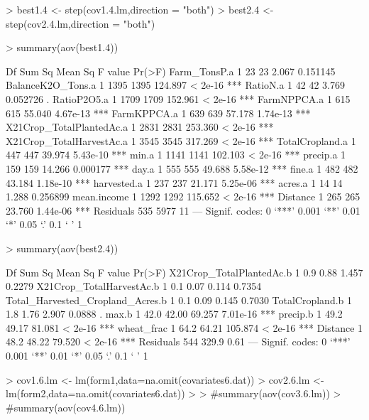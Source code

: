 \documentclass{report}
\begin{document}
\begin{Schunk}
\begin{Sinput}
> best1.4 <- step(cov1.4.lm,direction = "both")
> best2.4 <- step(cov2.4.lm,direction = "both")
\end{Sinput}
\end{Schunk}
\begin{Schunk}
\begin{Sinput}
> summary(aov(best1.4))
\end{Sinput}
\begin{Soutput}
                          Df Sum Sq Mean Sq F value   Pr(>F)    
Farm_TonsP.a               1     23      23   2.067 0.151145    
BalanceK2O_Tons.a          1   1395    1395 124.897  < 2e-16 ***
RatioN.a                   1     42      42   3.769 0.052726 .  
RatioP2O5.a                1   1709    1709 152.961  < 2e-16 ***
FarmNPPCA.a                1    615     615  55.040 4.67e-13 ***
FarmKPPCA.a                1    639     639  57.178 1.74e-13 ***
X21Crop_TotalPlantedAc.a   1   2831    2831 253.360  < 2e-16 ***
X21Crop_TotalHarvestAc.a   1   3545    3545 317.269  < 2e-16 ***
TotalCropland.a            1    447     447  39.974 5.43e-10 ***
min.a                      1   1141    1141 102.103  < 2e-16 ***
precip.a                   1    159     159  14.266 0.000177 ***
day.a                      1    555     555  49.688 5.58e-12 ***
fine.a                     1    482     482  43.184 1.18e-10 ***
harvested.a                1    237     237  21.171 5.25e-06 ***
acres.a                    1     14      14   1.288 0.256899    
mean.income                1   1292    1292 115.652  < 2e-16 ***
Distance                   1    265     265  23.760 1.44e-06 ***
Residuals                535   5977      11                     
---
Signif. codes:  0 ‘***’ 0.001 ‘**’ 0.01 ‘*’ 0.05 ‘.’ 0.1 ‘ ’ 1
\end{Soutput}
\begin{Sinput}
> summary(aov(best2.4))
\end{Sinput}
\begin{Soutput}
                                  Df Sum Sq Mean Sq F value   Pr(>F)    
X21Crop_TotalPlantedAc.b           1    0.9    0.88   1.457   0.2279    
X21Crop_TotalHarvestAc.b           1    0.1    0.07   0.114   0.7354    
Total_Harvested_Cropland_Acres.b   1    0.1    0.09   0.145   0.7030    
TotalCropland.b                    1    1.8    1.76   2.907   0.0888 .  
max.b                              1   42.0   42.00  69.257 7.01e-16 ***
precip.b                           1   49.2   49.17  81.081  < 2e-16 ***
wheat_frac                         1   64.2   64.21 105.874  < 2e-16 ***
Distance                           1   48.2   48.22  79.520  < 2e-16 ***
Residuals                        544  329.9    0.61                     
---
Signif. codes:  0 ‘***’ 0.001 ‘**’ 0.01 ‘*’ 0.05 ‘.’ 0.1 ‘ ’ 1
\end{Soutput}
\begin{Sinput}
> cov1.6.lm <- lm(form1,data=na.omit(covariates6.dat))
> cov2.6.lm <- lm(form2,data=na.omit(covariates6.dat))
> 
> #summary(aov(cov3.6.lm))
> #summary(aov(cov4.6.lm))
\end{Sinput}
\end{Schunk}
\end{document}
